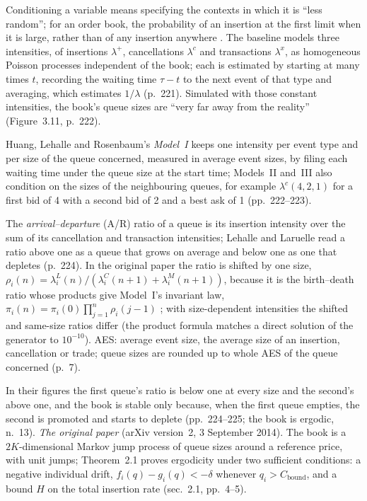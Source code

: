 \begin{qfmodel}\label{mod:queue-reactive-intensities}
 Conditioning a variable means specifying the contexts in which it is ``less random''; for an order book, the probability of an insertion at the first limit when it is large, rather than of any insertion anywhere \citep[chap.~3, sec.~3.3.2, pp.~219--220]{alpha-laruelle}. The baseline models three intensities, of insertions $\lambda^+$, cancellations $\lambda^c$ and transactions $\lambda^x$, as homogeneous Poisson processes independent of the book; each is estimated by starting at many times $t$, recording the waiting time $\tau-t$ to the next event of that type and averaging, which estimates $1/\lambda$ (p.~221). Simulated with those constant intensities, the book's queue sizes are ``very far away from the reality'' (Figure~3.11, p.~222).

Huang, Lehalle and Rosenbaum's \emph{Model~I} keeps one intensity per event type and per size of the queue concerned, measured in average event sizes, by filing each waiting time under the queue size at the start time; Models~II and~III also condition on the sizes of the neighbouring queues, for example $\lambda^c(4,2,1)$ for a first bid of 4 with a second bid of 2 and a best ask of 1 (pp.~222--223).

 The \emph{arrival--departure} (A/R) ratio of a queue is its insertion intensity over the sum of its cancellation and transaction intensities; Lehalle and Laruelle read a ratio above one as a queue that grows on average and below one as one that depletes (p.~224). In the original paper the ratio is shifted by one size, $\rho_i(n)=\lambda^L_i(n)/(\lambda^C_i(n+1)+\lambda^M_i(n+1))$, because it is the birth--death ratio whose products give Model~I's invariant law, $\pi_i(n)=\pi_i(0)\prod_{j=1}^n\rho_i(j-1)$ \citep[arXiv v2, sec.~2.3.3, p.~10]{exp-huang-lehalle-rosenbaum-queue-reactive}; with size-dependent intensities the shifted and same-size ratios differ (the product formula matches a direct solution of the generator to $10^{-10}$). AES: average event size, the average size of an insertion, cancellation or trade; queue sizes are rounded up to whole AES of the queue concerned (p.~7).

 In their figures the first queue's ratio is below one at every size and the second's above one, and the book is stable only because, when the first queue empties, the second is promoted and starts to deplete (pp.~224--225; the book is ergodic, n.~13). \emph{The original paper} (arXiv version~2, 3 September 2014). The book is a $2K$-dimensional Markov jump process of queue sizes around a reference price, with unit jumps; Theorem~2.1 proves ergodicity under two sufficient conditions: a negative individual drift, $f_i(q)-g_i(q)<-\delta$ whenever $q_i>C_{\text{bound}}$, and a bound $H$ on the total insertion rate (sec.~2.1, pp.~4--5).


\end{qfmodel}
